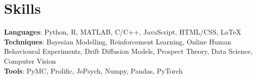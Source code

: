 \documentclass[letterpaper,11pt]{article}
\begin{document}
\section{Skills}
\begin{itemize}[leftmargin=0.15in, label={}]
    \small{\item{

          \textbf{Languages}{: Python, R, MATLAB, C/C++, JavaScript, HTML/CSS, \LaTeX} \\
          \textbf{Techniques}{: Bayesian Modelling, Reinforcement Learning, Online Human Behavioural Experiments, Drift Diffusion Models, Prospect Theory, Data Science, Computer Vision}\\
          \textbf{Tools}{: PyMC, Prolific, JsPsych, Numpy, Pandas, PyTorch}
          }}
\end{itemize}
\end{document}
